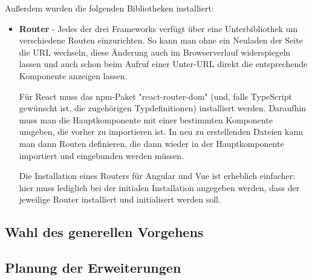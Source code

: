 Außerdem wurden die folgenden Bibliotheken installiert:

\begin{itemize}
\item \textbf{Router} - Jedes der drei Frameworks verfügt über eine Unterbibliothek um verschiedene Routen einzurichten. So kann man ohne ein Neuladen der Seite die URL wechseln, diese Änderung auch im Browserverlauf widerspiegeln lassen und auch schon beim Aufruf einer Unter-URL direkt die entsprechende Komponente anzeigen lassen.

Für React muss das \gls{npm}-Paket "react-router-dom" (und, falls TypeScript gewünscht ist, die zugehörigen Typdefinitionen) installiert werden. Daraufhin muss man die Hauptkomponente mit einer bestimmten Komponente umgeben, die vorher zu importieren ist. In neu zu erstellenden Dateien kann man dann Routen definieren, die dann wieder in der Hauptkomponente importiert und eingebunden werden müssen.

Die Installation eines Routers für Angular und Vue ist erheblich einfacher: hier muss lediglich bei der initialen Installation angegeben werden, dass der jeweilige Router installiert und initialisert werden soll.
\end{itemize}

\subsection{Wahl des generellen Vorgehens}
\subsection{Planung der Erweiterungen}
